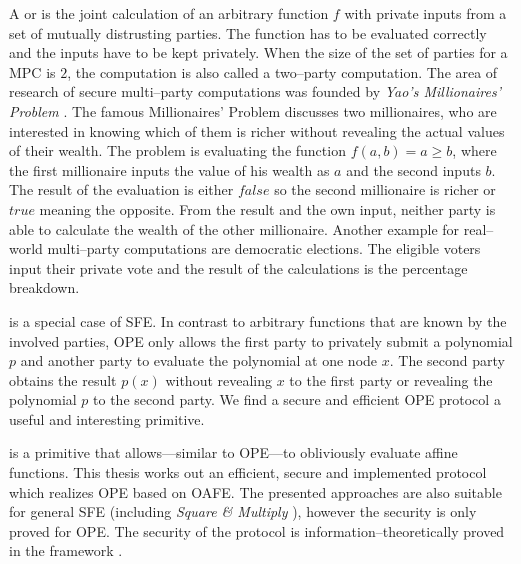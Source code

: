 \label{sec:introduction}

A  or  is the joint calculation of an arbitrary function $f$ with
private inputs from a set of mutually distrusting parties. The function has to
be evaluated correctly and the inputs have to be kept privately.  When the size
of the set of parties for a MPC is $2$, the computation is also called a
two--party computation. The area of research of secure multi--party computations
was founded by \emph{Yao's Millionaires' Problem} \cite{yao82}. The famous
Millionaires' Problem discusses two millionaires, who are interested in knowing
which of them is richer without revealing the actual values of their wealth. The
problem is evaluating the function $f(a, b) = a \geq b$, where the first
millionaire inputs the value of his wealth as $a$ and the second inputs $b$. The
result of the evaluation is either $false$ so the second millionaire is richer
or $true$ meaning the opposite. From the result and the own input, neither party
is able to calculate the wealth of the other millionaire. Another example for
real--world multi--party computations are democratic elections. The eligible
voters input their private vote and the result of the calculations is the
percentage breakdown.

 \cite{naor99,naor06} is a special
case of SFE. In contrast to arbitrary functions that are known by the involved
parties, OPE only allows the first party to privately submit a polynomial $p$
and another party to evaluate the polynomial at one node $x$. The second party
obtains the result $p(x)$ without revealing $x$ to the first party or revealing
the polynomial $p$ to the second party. We find a secure and efficient OPE
protocol a useful and interesting primitive.

 \cite{davidgoliath} is a
primitive that allows---similar to OPE---to obliviously evaluate affine
functions. This thesis works out an efficient, secure and implemented protocol
which realizes OPE based on OAFE. The presented approaches are also suitable for
general SFE (including \emph{Square \& Multiply} \cite{knuth81}), however the
security is only proved for OPE. The security of the protocol is
information--theoretically proved in the 
framework \cite{canetti05}.


%
%
\label{sec:related-work}

